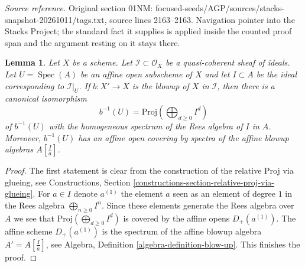 \documentclass[10pt,a4paper]{amsart}
\theoremstyle{plain}
\newtheorem{lemma}[subsection]{Lemma}
\theoremstyle{definition}
\theoremstyle{remark}
\numberwithin{equation}{subsection}
\def\Spec{\mathop{\mathrm{Spec}}}
\begin{document}
\noindent\textit{Source reference.} Original section 01NM: focused-seeds/AGP/sources/stacks-snapshot-20261011/tags.txt, source lines 2163--2163. Navigation pointer into the Stacks Project; the standard fact it supplies is applied inside the counted proof span and the argument resting on it stays there.\par\medskip
\begin{lemma}
\label{lemma-blowing-up-affine}
Let $X$ be a scheme. Let $\mathcal{I} \subset \mathcal{O}_X$ be a
quasi-coherent sheaf of ideals. Let $U = \Spec(A)$ be an affine open
subscheme of $X$ and let $I \subset A$ be the ideal corresponding to
$\mathcal{I}|_U$. If $b : X' \to X$ is the blowup of $X$ in $\mathcal{I}$,
then there is a canonical isomorphism
$$
b^{-1}(U) = \text{Proj}(\bigoplus\nolimits_{d \geq 0} I^d)
$$
of $b^{-1}(U)$ with the homogeneous spectrum of the Rees algebra
of $I$ in $A$. Moreover, $b^{-1}(U)$ has an affine open covering by
spectra of the affine blowup algebras $A[\frac{I}{a}]$.
\end{lemma}

\begin{proof}
The first statement is clear from the construction of the relative Proj via
glueing, see Constructions, Section
\ref{constructions-section-relative-proj-via-glueing}.
For $a \in I$ denote $a^{(1)}$ the element $a$ seen as an element of
degree $1$ in the Rees algebra $\bigoplus_{n \geq 0} I^n$.
Since these elements generate the Rees algebra over $A$ we see that
$\text{Proj}(\bigoplus_{d \geq 0} I^d)$ is covered by the affine opens
$D_{+}(a^{(1)})$. The affine scheme $D_{+}(a^{(1)})$ is the spectrum of
the affine blowup algebra $A' = A[\frac{I}{a}]$, see
Algebra, Definition \ref{algebra-definition-blow-up}.
This finishes the proof.
\end{proof}
\end{document}
